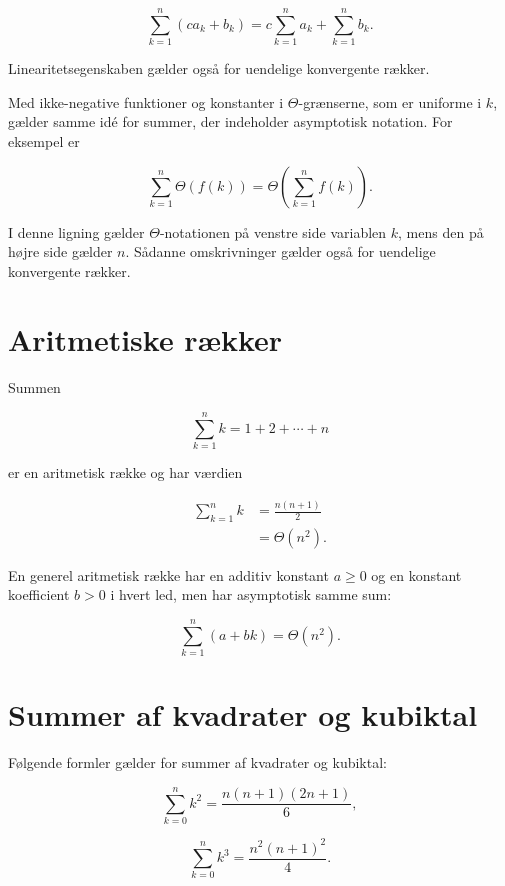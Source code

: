\[
    \sum_{k=1}^n\left(c a_k+b_k\right)=c \sum_{k=1}^n a_k+\sum_{k=1}^n b_k .
\]

Linearitetsegenskaben gælder også for uendelige konvergente rækker.

Med ikke-negative funktioner og konstanter i $\Theta$-grænserne, som er uniforme i $k$, gælder samme idé for summer, der indeholder asymptotisk notation. For eksempel er

\[
    \sum_{k=1}^n \Theta(f(k))=\Theta\left(\sum_{k=1}^n f(k)\right) .
\]

I denne ligning gælder $\Theta$-notationen på venstre side variablen $k$, mens den på højre side gælder $n$. Sådanne omskrivninger gælder også for uendelige konvergente rækker.

\section*{Aritmetiske rækker}
Summen


\[
        \sum_{k=1}^n k=1+2+\cdots+n \label{eq:arithmetic-series}
\]

er en aritmetisk række og har værdien


\begin{align}
    \sum_{k=1}^n k & =\frac{n(n+1)}{2} \label{eq:sum-of-natural-numbers}  \\
    & =\Theta\left(n^2\right) . \label{eq:arithmetic-series-asymptotic}
\end{align}

En generel aritmetisk række har en additiv konstant $a \geq 0$ og en konstant koefficient $b>0$ i hvert led, men har asymptotisk samme sum:

\begin{equation}
    \sum_{k=1}^n(a+b k)=\Theta\left(n^2\right) . \label{eq:general-arithmetic-series}
    \end{equation}

\section*{Summer af kvadrater og kubiktal}
Følgende formler gælder for summer af kvadrater og kubiktal:

    \begin{equation}
    \sum_{k=0}^n k^2=\frac{n(n+1)(2 n+1)}{6}, \label{eq:sum-of-squares}
    \end{equation}

    \begin{equation}
        \sum_{k=0}^n k^3=\frac{n^2(n+1)^2}{4} . \label{eq:sum-of-cubes}
        \end{equation}


